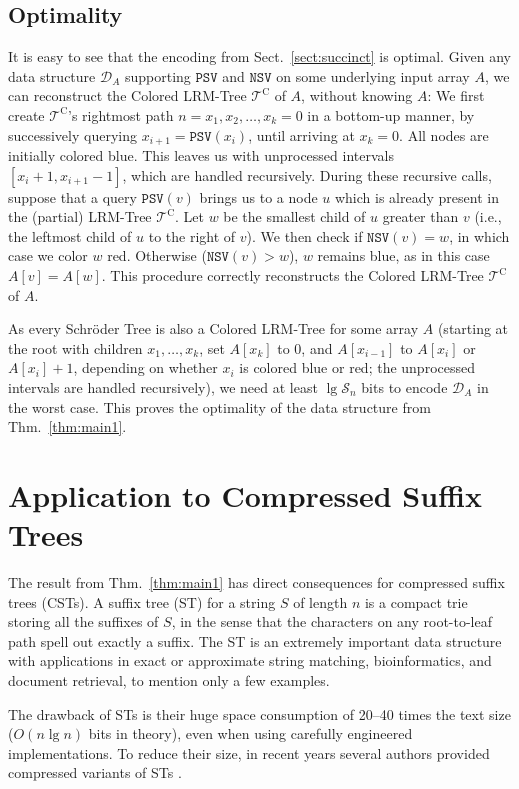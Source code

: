 \documentclass[11pt,onecolumn,final]{article} \usepackage{a4}
\newcommand{\supcat}{\mathcal{S}}
\newcommand{\psv}[0]{\mathtt{PSV}}
\newcommand{\nsv}[0]{\mathtt{NSV}}
\theoremstyle{plain}
\theoremstyle{remark}
\begin{document}
\subsection{Optimality}
It is easy to see that the encoding from Sect.~\ref{sect:succinct} is optimal. Given any data structure $\mathscr{D}_A$ supporting $\psv$ and $\nsv$ on some underlying input array $A$, we can reconstruct the Colored LRM-Tree $\mathcal{T}^\textrm{C}$ of $A$, without knowing $A$: We first create $\mathcal{T}^\textrm{C}$'s rightmost path $n=x_1, x_2, \dots, x_k=0$ in a bottom-up manner, by successively querying $x_{i+1} = \psv(x_i)$, until arriving at $x_k=0$. All nodes are initially colored blue. This leaves us with unprocessed intervals $[x_i+1,x_{i+1}-1]$, which are handled recursively. During these recursive calls, suppose that a query $\psv(v)$ brings us to a node $u$ which is already present in the (partial) LRM-Tree $\mathcal{T}^\textrm{C}$. Let $w$ be the smallest child of $u$ greater than $v$ (i.e., the leftmost child of $u$ to the right of $v$). We then check if $\nsv(v)=w$, in which case we color $w$ red. Otherwise ($\nsv(v)> w$), $w$ remains blue, as in this case $A[v] = A[w]$. This procedure correctly reconstructs the Colored LRM-Tree $\mathcal{T}^\textrm{C}$ of $A$.

As every Schr\"oder Tree is also a Colored LRM-Tree for some array $A$ (starting at the root with children $x_1,\dots,x_k$, set $A[x_k]$ to 0, and $A[x_{i-1}]$ to $A[x_{i}]$ or $A[x_{i}]+1$, depending on whether $x_i$ is colored blue or red; the unprocessed intervals are handled recursively), we need at least $\lg \supcat_n$ bits to encode $\mathscr{D}_A$ in the worst case. This proves the optimality of the data structure from Thm.~\ref{thm:main1}.

\section{Application to Compressed Suffix Trees}
\label{sect:cst}
The result from Thm.~\ref{thm:main1} has direct consequences for compressed suffix trees (CSTs). A suffix tree (ST) for a string $S$ of length $n$ is a compact trie storing all the suffixes of $S$, in the sense that the characters on any root-to-leaf path spell out exactly a suffix. The ST is an extremely important data structure with applications in exact or approximate string matching, bioinformatics, and document retrieval, to mention only a few examples.

The drawback of STs is their huge space consumption of 20--40 times the text size ($O(n\lg n)$ bits in theory), even when using carefully engineered implementations. To reduce their size, in recent years several authors provided compressed variants of STs \cite{munro01space,grossi05compressed,sadakane07compressed,russo08fully,fischer09faster,ohlebusch09compressed,canovas10practical,ohlebusch10cst++,fischer10wee}.
\end{document}
